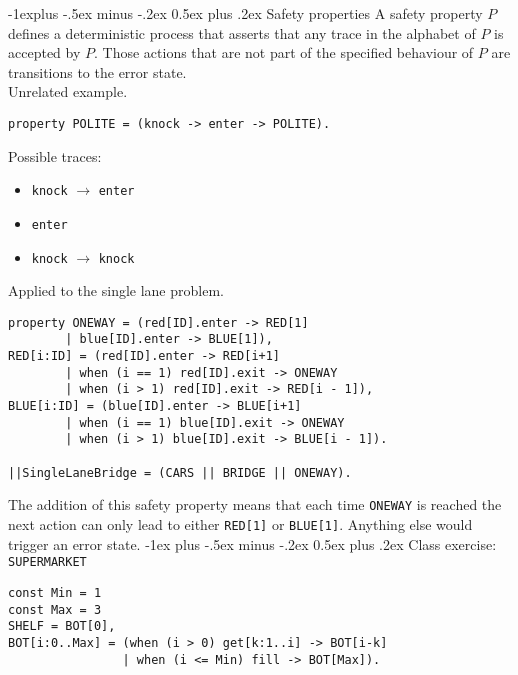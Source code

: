\documentclass[10pt,landscape]{article}
\makeatletter
\renewcommand{\section}{\@startsection{section}{1}{0mm}%
                                {-1ex plus -.5ex minus -.2ex}%
                                {0.5ex plus .2ex}%
                                {\normalfont\large\bfseries}}
\renewcommand{\subsection}{\@startsection{subsection}{2}{0mm}%
                                {-1explus -.5ex minus -.2ex}%
                                {0.5ex plus .2ex}%
                                {\normalfont\normalsize\bfseries}}
\makeatother
\begin{document}
\begin{multicols}{3}
\subsection{Safety properties}
A safety property $P$ defines a deterministic process that asserts that any trace in the alphabet of $P$ is accepted by $P$. Those actions that are not part of the specified behaviour of $P$ are transitions to the error state. \\
Unrelated example.
\begin{verbatim}
property POLITE = (knock -> enter -> POLITE).
\end{verbatim}
\begin{center}
\end{center}
Possible traces:
\begin{itemize}
    \item \texttt{knock} $\rightarrow$ \texttt{enter} 
    \item \texttt{enter} 
    \item \texttt{knock} $\rightarrow$ \texttt{knock} 
\end{itemize}
Applied to the single lane problem.
\begin{verbatim}
property ONEWAY = (red[ID].enter -> RED[1]
        | blue[ID].enter -> BLUE[1]),
RED[i:ID] = (red[ID].enter -> RED[i+1]
        | when (i == 1) red[ID].exit -> ONEWAY
        | when (i > 1) red[ID].exit -> RED[i - 1]),
BLUE[i:ID] = (blue[ID].enter -> BLUE[i+1]
        | when (i == 1) blue[ID].exit -> ONEWAY
        | when (i > 1) blue[ID].exit -> BLUE[i - 1]).
        
||SingleLaneBridge = (CARS || BRIDGE || ONEWAY).
\end{verbatim}
The addition of this safety property means that each time \texttt{ONEWAY} is reached the next action can only lead to either \texttt{RED[1]} or \texttt{BLUE[1]}. Anything else would trigger an error state.
\section{Class exercise: \texttt{SUPERMARKET}}
\begin{verbatim}
const Min = 1
const Max = 3
SHELF = BOT[0],
BOT[i:0..Max] = (when (i > 0) get[k:1..i] -> BOT[i-k]
				| when (i <= Min) fill -> BOT[Max]).


\end{verbatim}
\end{multicols}
\end{document}
